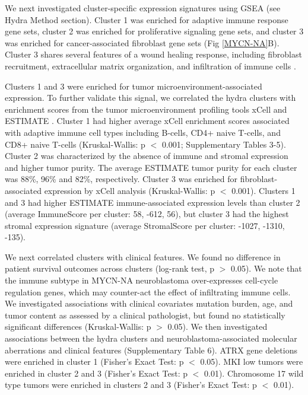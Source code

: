 \documentclass[10pt,letterpaper]{article}
\begin{document}
We next investigated cluster-specific expression signatures using GSEA (see Hydra Method section). Cluster 1 was enriched for adaptive immune response gene sets, cluster 2 was enriched for proliferative signaling gene sets, and cluster 3 was enriched for cancer-associated fibroblast gene sets (Fig \ref{MYCN-NA}B). Cluster 3 shares several features of a wound healing response, including fibroblast recruitment, extracellular matrix organization, and infiltration of immune cells \cite{fosterEvolvingRelationshipWound}. 

Clusters 1 and 3 were enriched for tumor microenvironment-associated expression. To further validate this signal, we correlated the hydra clusters with enrichment scores from the tumor microenvironment profiling tools xCell \cite{aranXCellDigitallyPortraying2017} and ESTIMATE \cite{yoshiharaInferringTumourPurity2013a}. Cluster 1 had higher average xCell enrichment scores associated with adaptive immune cell types including B-cells, CD4+ naive T-cells, and CD8+ naive T-cells (Kruskal-Wallis: p $<$ 0.001; Supplementary Tables 3-5). Cluster 2 was characterized by the absence of immune and stromal expression and higher tumor purity. The average ESTIMATE tumor purity for each cluster was 88\%, 96\% and 82\%, respectively. Cluster 3 was enriched for fibroblast-associated expression by xCell analysis (Kruskal-Wallis: p $<$ 0.001). Clusters 1 and 3 had higher ESTIMATE immune-associated expression levels than cluster 2 (average ImmuneScore per cluster: 58, -612, 56), but cluster 3 had the highest stromal expression signature (average StromalScore per cluster: -1027, -1310, -135).

We next correlated clusters with clinical features. We found no difference in patient survival outcomes across clusters (log-rank test, p $>$ 0.05). We note that the immune subtype in MYCN-NA neuroblastoma over-expresses cell-cycle regulation genes, which may counter-act the effect of infiltrating immune cells. We investigated associations with clinical covariates mutation burden, age, and tumor content as assessed by a clinical pathologist, but found no statistically significant differences (Kruskal-Wallis: p $>$ 0.05). We then investigated associations between the hydra clusters and neuroblastoma-associated molecular aberrations and clinical features (Supplementary Table 6). ATRX gene deletions were enriched in cluster 1 (Fisher’s Exact Test: p $<$ 0.05). MKI low tumors were enriched in cluster 2 and 3 (Fisher’s Exact Test: p $<$ 0.01). Chromosome 17 wild type tumors were enriched in clusters 2 and 3 (Fisher’s Exact Test: p $<$ 0.01).
\end{document}
